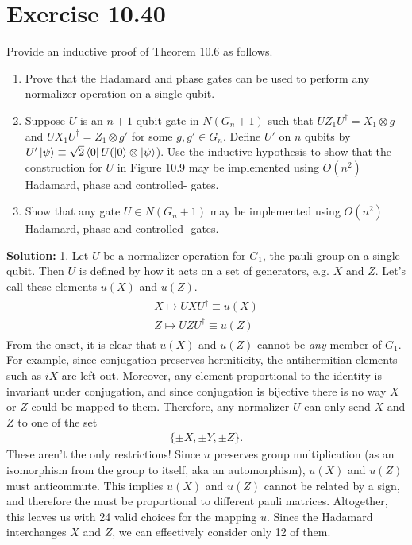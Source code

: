 \documentclass{book}
\begin{document}
\section*{Exercise 10.40}
    Provide an inductive proof of Theorem 10.6 as follows.
    \begin{enumerate}
        \item Prove that the Hadamard and phase gates can be used to perform any normalizer operation on a single qubit.
    
        \item Suppose $U$ is an $n+1$ qubit gate in $N(G_n+1)$ such that $U Z_1 U^\dagger = X_1 \otimes g$ and $U X_1 U^\dagger = Z_1 \otimes g'$ for some $g,g' \in G_n$. Define $U'$ on $n$ qubits by $U'\ket{\psi} \equiv \sqrt{2}\bra{0} U (\ket{0} \otimes \ket{\psi}$). Use the inductive hypothesis to show that the construction for $U$ in Figure 10.9 may be implemented using $O(n^2)$ Hadamard, phase and controlled- gates.
    
        \item Show that any gate $U \in N(G_n+1)$ may be implemented using $O(n^2)$ Hadamard, phase and controlled- gates.
    \end{enumerate}
    
    \textbf{Solution:} 1. Let $U$ be a normalizer operation for $G_1$, the pauli group on a single qubit. Then $U$ is defined by how it acts on a set of generators, e.g. $X$ and $Z$. Let's call these elements $u(X)$ and $u(Z)$.
    \begin{align}
    \begin{aligned}
        X \mapsto UXU^\dagger \equiv u(X) \\
        Z \mapsto UZU^\dagger \equiv u(Z)
    \end{aligned}
    \end{align}
    From the onset, it is clear that $u(X)$ and $u(Z)$ cannot be \emph{any} member of $G_1$. For example, since conjugation preserves hermiticity, the antihermitian elements such as $i X$ are left out. Moreover, any element proportional to the identity is invariant under conjugation, and since conjugation is bijective there is no way $X$ or $Z$ could be mapped to them. Therefore, any normalizer $U$ can only send $X$ and $Z$ to one of the set
    \begin{align}
        \{\pm X, \pm Y, \pm Z\}. 
    \end{align}
    These aren't the only restrictions! Since $u$ preserves group multiplication (as an isomorphism from the group to itself, aka an automorphism), $u(X)$ and $u(Z)$ must anticommute. This implies $u(X)$ and $u(Z)$ cannot be related by a sign, and therefore the must be proportional to different pauli matrices. Altogether, this leaves us with 24 valid choices for the mapping $u$. Since the Hadamard interchanges $X$ and $Z$, we can effectively consider only 12 of them. 
    
\end{document}
